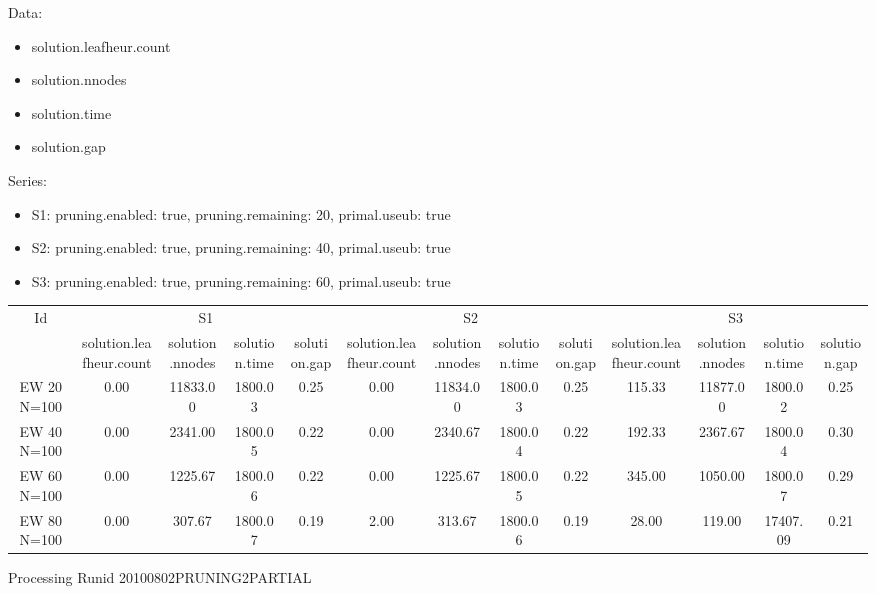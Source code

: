 \documentclass[landscape, 12pt]{report}
\begin{document}
Data:
\begin{itemize}
\item solution.leafheur.count
\item solution.nnodes
\item solution.time
\item solution.gap
\end{itemize}
Series:
\begin{itemize}
\item S1: pruning.enabled: true, pruning.remaining: 20, primal.useub: true
\item S2: pruning.enabled: true, pruning.remaining: 40, primal.useub: true
\item S3: pruning.enabled: true, pruning.remaining: 60, primal.useub: true
\end{itemize}
\begin{tabular}{|c|cccc|cccc|cccc|}
\hline
\multicolumn{1}{|c|}{Id} & \multicolumn{4}{|c|}{S1} & \multicolumn{4}{|c|}{S2} & \multicolumn{4}{|c|}{S3}
\\
 & solution.leafheur.count & solution.nnodes & solution.time & solution.gap & solution.leafheur.count & solution.nnodes & solution.time & solution.gap & solution.leafheur.count & solution.nnodes & solution.time & solution.gap
\\
\hline
EW 20 N=100 & 0.00 & 11833.00 & 1800.03 & 0.25 & 0.00 & 11834.00 & 1800.03 & 0.25 & 115.33 & 11877.00 & 1800.02 & 0.25
\\
EW 40 N=100 & 0.00 & 2341.00 & 1800.05 & 0.22 & 0.00 & 2340.67 & 1800.04 & 0.22 & 192.33 & 2367.67 & 1800.04 & 0.30
\\
EW 60 N=100 & 0.00 & 1225.67 & 1800.06 & 0.22 & 0.00 & 1225.67 & 1800.05 & 0.22 & 345.00 & 1050.00 & 1800.07 & 0.29
\\
EW 80 N=100 & 0.00 & 307.67 & 1800.07 & 0.19 & 2.00 & 313.67 & 1800.06 & 0.19 & 28.00 & 119.00 & 17407.09 & 0.21
\\
\hline 
 \end{tabular}

	
	 \clearpage
	
Processing Runid 20100802PRUNING2PARTIAL
	
\end{document}
